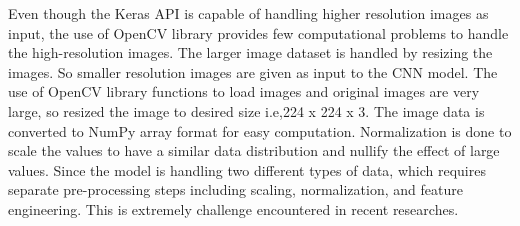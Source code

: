 Even though the Keras API is capable of handling higher resolution images as input, the use of OpenCV library provides few computational problems to handle the high-resolution images. The larger image dataset is handled by resizing the images. So smaller resolution images are given as input to the CNN model. The use of OpenCV library functions to load images and original images are very large, so resized the image to desired size i.e,224 x 224 x 3. The image data is converted to NumPy array format for easy computation. Normalization is done to scale the values to have a similar data distribution and nullify the effect of large values. Since the model is handling two different types of data, which requires separate pre-processing steps including scaling, normalization, and feature engineering. This is extremely challenge encountered in recent researches.
